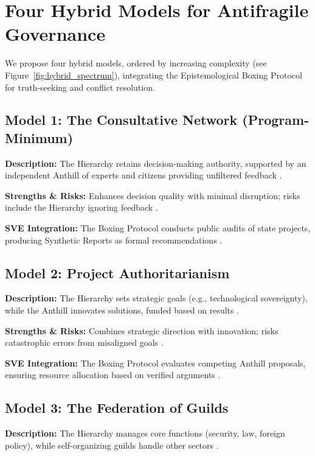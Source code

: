 \documentclass[11pt,a4paper]{article}
\begin{document}
\section{Four Hybrid Models for Antifragile Governance}
We propose four hybrid models, ordered by increasing complexity (see Figure~\ref{fig:hybrid_spectrum}), integrating the Epistemological Boxing Protocol for truth-seeking and conflict resolution.

\subsection{Model 1: The Consultative Network (Program-Minimum)}
\textbf{Description:} The Hierarchy retains decision-making authority, supported by an independent Anthill of experts and citizens providing unfiltered feedback \citep[lines 2268--2270]{HybridModelsMemo}.

\textbf{Strengths \& Risks:} Enhances decision quality with minimal disruption; risks include the Hierarchy ignoring feedback \citep[lines 2272--2273]{HybridModelsMemo}.

\textbf{SVE Integration:} The Boxing Protocol conducts public audits of state projects, producing Synthetic Reports as formal recommendations \citep[lines 2276--2277]{HybridModelsMemo}.

\subsection{Model 2: Project Authoritarianism}
\textbf{Description:} The Hierarchy sets strategic goals (e.g., technological sovereignty), while the Anthill innovates solutions, funded based on results \citep[lines 2279--2281]{HybridModelsMemo}.

\textbf{Strengths \& Risks:} Combines strategic direction with innovation; risks catastrophic errors from misaligned goals \citep[lines 2282--2283]{HybridModelsMemo}.

\textbf{SVE Integration:} The Boxing Protocol evaluates competing Anthill proposals, ensuring resource allocation based on verified arguments \citep[lines 2287--2289]{HybridModelsMemo}.

\subsection{Model 3: The Federation of Guilds}
\textbf{Description:} The Hierarchy manages core functions (security, law, foreign policy), while self-organizing guilds handle other sectors \citep[lines 2292--2293]{HybridModelsMemo}.
\end{document}
